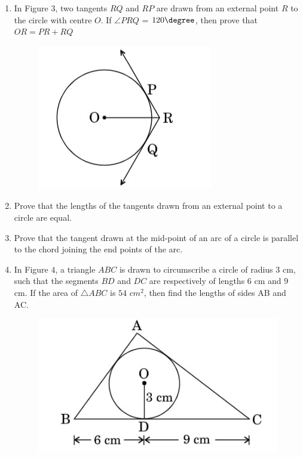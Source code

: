 \begin{enumerate}
  \item In Figure $3$, two tangents $RQ$ and $RP$ are drawn from an external point $R$ to  the   circle   with   centre   $O$.   If   $\angle PRQ $  =  $120\degree$,  then   prove   that $ OR=PR+RQ $ 
   \begin{figure}[h]
        \centering
           \includegraphics[width=0.6\columnwidth]{figs/cir13.jpg}
       \end{figure}
  \item Prove that the lengths of the tangents drawn from an external point to a circle are equal.
   \item Prove that the tangent drawn at the mid-point of an arc of  a  circle  is parallel to the chord joining the end points of the arc.      
   \item  In  Figure  $4$,  a  triangle  $ ABC $  is  drawn  to  circumscribe  a  circle  of  radius $3$ cm, such that the segments $ BD $ and $ DC $ are respectively of lengths $6$ cm and $9$ cm. If the area of $\triangle ABC$ is $54$ $cm^2$, then find the lengths of sides AB and AC.
    \begin{figure}[h]
       \centering
       \includegraphics[width=0.6\columnwidth]{figs/cir14.jpg}
    \end{figure}
    \end{enumerate}
